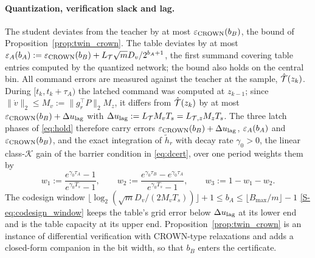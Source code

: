 \paragraph{Quantization, verification slack and lag.}
The student deviates from the teacher by at most $\varepsilon_{\mathrm{CROWN}}(b_B)$, the bound of Proposition~\ref{prop:twin_crown}. The table deviates by at most $\varepsilon_A(b_A) := \varepsilon_{\mathrm{CROWN}}(b_B) + L_{\mathcal{T}}\sqrt{m}D_v/2^{b_A+1}$, the first summand covering table entries computed by the quantized network; the bound also holds on the central bin. All command errors are measured against the teacher at the sample, $\hat{\mathcal{T}}(z_k)$. During $[t_k, t_k + \tau_A)$ the latched command was computed at $z_{k-1}$; since $\|\dot v\|_2 \le M_v := \|g_r^\top P\|_2M_z$, it differs from $\hat{\mathcal{T}}(z_k)$ by at most $\varepsilon_{\mathrm{CROWN}}(b_B) + \Delta u_{\mathrm{lag}}$ with $\Delta u_{\mathrm{lag}} := L_{\mathcal{T}}M_vT_s = L_{\mathcal{T},z} M_zT_s$. The three latch phases of \eqref{eq:hold} therefore carry errors $\varepsilon_{\mathrm{CROWN}}(b_B) + \Delta u_{\mathrm{lag}}$, $\varepsilon_A(b_A)$ and $\varepsilon_{\mathrm{CROWN}}(b_B)$, and the exact integration of $\tilde h_r$ with decay rate $\gamma_0 > 0$, the linear class-$\mathcal{K}$ gain of the barrier condition in \eqref{eq:dcert}, over one period weights them by
\begin{equation}
\label{eq:weights}
w_1 := \frac{e^{\gamma_0\tau_A} - 1}{e^{\gamma_0T_s} - 1}, \qquad w_2 := \frac{e^{\gamma_0\tau_B} - e^{\gamma_0\tau_A}}{e^{\gamma_0T_s} - 1}, \qquad w_3 := 1 - w_1 - w_2 .
\end{equation}
The codesign window $\lfloor\log_2(\sqrt{m}D_v/(2M_vT_s))\rfloor + 1 \le b_A \le \lfloor B_{\max}/m\rfloor - 1$ \eqref{S-eq:codesign_window} keeps the table's grid error below $\Delta u_{\mathrm{lag}}$ at its lower end and is the table capacity at its upper end. Proposition~\ref{prop:twin_crown} is an instance of differential verification \citep{paulsen2020reludiff,zhang2023qebverif} with CROWN-type relaxations \citep{zhang2018crown,xu2020autolirpa} and adds a closed-form companion in the bit width, so that $b_B$ enters the certificate.

